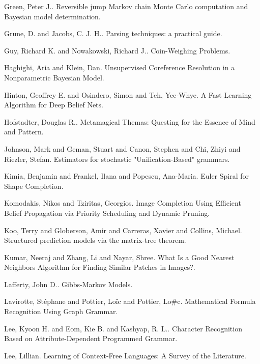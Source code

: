 \documentclass{article}
\begin{document}
\item Green, Peter J.. Reversible jump Markov chain Monte Carlo computation and Bayesian model determination. \cite{Green1995Reversible}
\item Grune, D. and Jacobs, C. J. H.. Parsing techniques: a practical guide. \cite{grune-jacobs-90}
\item Guy, Richard K. and Nowakowski, Richard J.. Coin-Weighing Problems. \cite{Guy1995CoinWeighing}
\item Haghighi, Aria and Klein, Dan. Unsupervised Coreference Resolution in a Nonparametric Bayesian Model. \cite{Haghighi2007Unsupervised}
\item Hinton, Geoffrey E. and Osindero, Simon and Teh, Yee-Whye. A Fast Learning Algorithm for Deep Belief Nets. \cite{Hinton2006Fast}
\item Hofstadter, Douglas R.. Metamagical Themas: Questing for the Essence of Mind and Pattern. \cite{Hofstadter1996Metamagical}
\item Johnson, Mark and Geman, Stuart and Canon, Stephen and Chi, Zhiyi and Riezler, Stefan. Estimators for stochastic "Unification-Based" grammars. \cite{Johnson1999Estimators}
\item Kimia, Benjamin and Frankel, Ilana and Popescu, Ana-Maria. Euler Spiral for Shape Completion. \cite{Kimia2003Euler}
\item Komodakis, Nikos and Tziritas, Georgios. Image Completion Using Efficient Belief Propagation via Priority Scheduling and Dynamic Pruning. \cite{KomodakisImage}
\item Koo, Terry and Globerson, Amir and Carreras, Xavier and Collins, Michael. Structured prediction models via the matrix-tree theorem. \cite{Koo2007Structured}
\item Kumar, Neeraj and Zhang, Li and Nayar, Shree. What Is a Good Nearest Neighbors Algorithm for Finding Similar Patches in Images?. \cite{Kumar2008What}
\item Lafferty, John D.. Gibbs-Markov Models. \cite{Lafferty1996GibbsMarkov}
\item Lavirotte, St\'{e}phane and Pottier, Lo\"{i}c and Pottier, Lo\#c. Mathematical Formula Recognition Using Graph Grammar. \cite{Lavirotte1998Mathematical}
\item Lee, Kyoon H. and Eom, Kie B. and Kashyap, R. L.. Character Recognition Based on Attribute-Dependent Programmed Grammar. \cite{Lee1992Character}
\item Lee, Lillian. Learning of Context-Free Languages: A Survey of the Literature. \cite{lee-induction}
\end{document}
